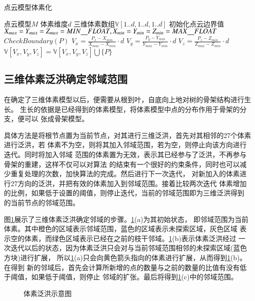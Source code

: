 \begin{algorithm}[H]
	\caption{点云模型体素化}
	\label{alg:voxel}
	\begin{algorithmic}[1] 
	\Require 点云模型$M$
	\Require 体素维度$d$
	\Ensure 三维体素数组$\mathbb{V}[1..d,1..d,1..d]$
	\State 初始化点云边界值$X_{max}=Y_{max}=Z_{max}=MIN\uline\quad FLOAT,X_{min}=Y_{min}=Z_{min}=MAX\uline\quad FLOAT$
		\State $CheckBoundary(P)$
	\EndFor
{}
\State $V_x = \frac{P_x-X_{min}}{X_{max}-X_{min}}\cdot d$
\State $V_y = \frac{P_y-Y_{min}}{Y_{max}-Y_{min}}\cdot d$
\State $V_z = \frac{P_z-Z_{min}}{Z_{max}-Z_{min}}\cdot d$
\State $\mathbb{V}[V_x, V_y, V_z] = \mathbb{V}[V_x, V_y, V_z] \bigcup \{P\} $
	\EndFor
\end{algorithmic}
\end{algorithm}

\subsection{三维体素泛洪确定邻域范围}
在确定了三维体素模型以后，便需要从根到叶，自底向上地对树的骨架结构进行生长。
生长的依据是已经得到的体素模型，将体素模型中点的分布作用于骨架的分支，便可以
张成骨架模型。

具体方法是将根节点置为当前节点，对其进行三维泛洪，首先对其相邻的27个体素进行泛洪，若
体素不为空，则将其加入邻域范围，若为空，则停止向该方向进行迭代。同时将加入邻域
范围的体素置为无效，表示其已经参与了泛洪，不再参与骨架的重建，这样不仅可以对算法
的结束有一个很好的约束条件，同时也可以减少重复处理的次数，加快算法的完成。然后进行下一次迭代，
对新加入的体素进行27方向的泛洪，并把有效的体素加入到邻域范围。接着比较两次迭代
体素增加的比例，如果低于设置的阈值，则停止迭代，当前的邻域范围即为三维泛洪得到
的当前节点的邻域范围。

图\ref{fig:3dfld}展示了三维体素泛洪确定邻域的步骤。\ref{fig:3dfld}(a)为其初始状态，
即邻域范围为当前体素。其中橙色的区域表示邻域范围，蓝色的区域表示未探索区域，灰色区域
表示空的体素，而绿色区域表示已经在之前的枝干邻域。\ref{fig:3dfld}(b)表示体素泛洪经过
一次迭代以后的状态，因为体素泛洪只会对与当前邻域范围相邻的未探索区域(蓝色方块)进行扩展，
所以\ref{fig:3dfld}(a)只会向黄色箭头指向的体素进行扩展，从而得到\ref{fig:3dfld}(b)。在得到
新的邻域后，首先会计算所新增的点的数量与之前的数量的比值有没有低于阈值，如果低于阈值，则停止
邻域的扩张。最后将得到\ref{fig:3dfld}(c)中的邻域范围。

\begin{figure}[H]
	\centering
	\hspace{4em}
	\hspace{4em}
	\caption{体素泛洪示意图}
	\label{fig:3dfld}
\end{figure}

